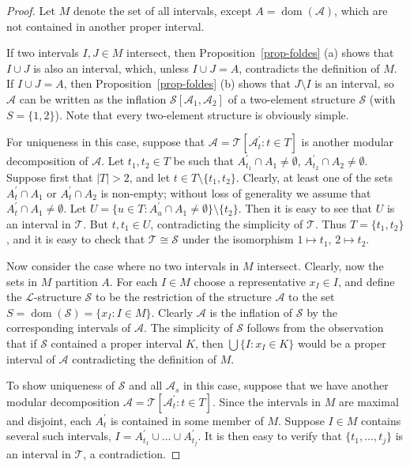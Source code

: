 \documentclass[11pt]{article}
\begin{document}
\begin{proof}
Let $M$ denote the set of all intervals, except $A={\operatorname{dom}}({\mathcal{A}})$, which are not contained in another proper interval.

If two intervals $I,J\in M$ intersect, then Proposition~\ref{prop-foldes} (a) shows that $I\cup J$ is also an interval, which, unless $I\cup J=A$, contradicts the definition of $M$.
If $I\cup J=A$, then Proposition~\ref{prop-foldes} (b) shows that $J\setminus I$ is an interval, so $\mathcal{A}$ can be written as the inflation
$\mathcal{S}[\mathcal{A}_1, \mathcal{A}_2]$
of a two-element structure $\mathcal{S}$ (with $S=\{1,2\}$).
Note that every two-element structure is obviously simple.

For uniqueness in this case, suppose that
$\mathcal{A}=\mathcal{T}[\mathcal{A}_t^\prime : t\in T]$
is another modular decomposition of $\mathcal{A}$. Let $t_1,t_2\in T$ be such that
$A_{t_1}^\prime\cap A_1\neq \emptyset$, $A_{t_2}^\prime\cap A_2\neq \emptyset$.
Suppose first that $|T|>2$, and let $t\in T\setminus\{t_1,t_2\}$.
Clearly, at least one of the sets $A_t^\prime\cap A_1$ or $A_t^\prime\cap A_2$ is non-empty;
without loss of generality we assume that
$A_t^\prime\cap A_1\neq \emptyset$. Let $U=\{ u\in T : A_u^\prime \cap A_1\neq\emptyset\}\setminus\{t_2\}$. Then it is easy to see that $U$ is an interval in $\mathcal{T}$. But $t,t_1\in U$, contradicting the simplicity of $\mathcal{T}$. Thus $T=\{t_1,t_2\}$, and it is easy to check that $\mathcal{T}\cong\mathcal{S}$ under the isomorphism $1\mapsto t_1$, $2\mapsto t_2$.

Now consider the case where no two intervals in $M$ intersect.
Clearly, now the sets in $M$ partition $A$.
For each $I\in M$ choose a representative $x_I\in I$, and define the $\mathcal{L}$-structure $\mathcal{S}$ to be the restriction
of the structure $\mathcal{A}$ to the set $S={\operatorname{dom}}(\mathcal{S})=\{x_I: I\in M\}$.
Clearly $\mathcal{A}$ is the inflation of $\mathcal{S}$ by the corresponding intervals of $\mathcal{A}$.
The simplicity of $\mathcal{S}$ follows from the observation that if $\mathcal{S}$ contained a proper interval $K$, then $\bigcup \{I : x_I\in K\}$ would be a proper interval of $\mathcal{A}$ contradicting the definition of $M$.

To show uniqueness of $\mathcal{S}$ and all $\mathcal{A}_s$ in this case, suppose that
we have another modular decomposition
$\mathcal{A}=\mathcal{T}[\mathcal{A}_t^\prime : t\in T]$.
Since the intervals in $M$ are maximal and disjoint, each $A_t^\prime$ is contained in some member of $M$.
Suppose $I\in M$ contains several such intervals, $I=A_{t_1}^\prime\cup\ldots\cup A_{t_j}^\prime$.
It is then easy to verify that $\{ t_1,\ldots, t_j\}$ is an interval in $\mathcal{T}$,
a contradiction.
\end{proof}
\end{document}
